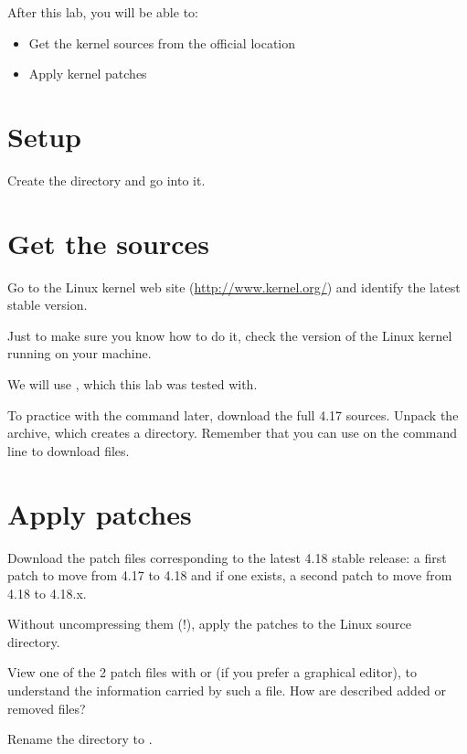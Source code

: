 
After this lab, you will be able to:
\begin{itemize}
\item Get the kernel sources from the official location
\item Apply kernel patches
\end{itemize}

\section{Setup}

Create the  directory and go into it.

\section{Get the sources}

Go to the Linux kernel web site (\url{http://www.kernel.org/}) and
identify the latest stable version.

Just to make sure you know how to do it, check the version of the
Linux kernel running on your machine.

We will use , which this lab was tested with.

To practice with the  command later, download the full 4.17
sources. Unpack the archive, which creates a 
directory. Remember that you can use  on the command
line to download files.

\section{Apply patches}

Download the patch files corresponding to the latest 4.18 stable
release: a first patch to move from 4.17 to 4.18 and if one exists,
a second patch to move from 4.18 to 4.18.x.

Without uncompressing them (!), apply the patches to the Linux
source directory.

View one of the 2 patch files with  or 
(if you prefer a graphical editor), to understand the information carried
by such a file. How are described added or removed files?

Rename the  directory to .
